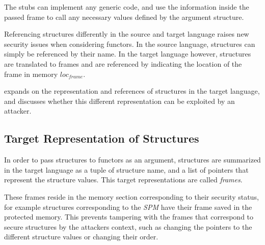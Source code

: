 \documentclass[10pt,a4paper,master=cws, masteroption=ai,english,inputenc=utf8]{kulemt}
\begin{document}
The stubs can implement any generic code, and use the information inside the passed frame to call any necessary values defined by the argument structure.

\smallskip

Referencing structures differently in the source and target language raises new security issues when considering functors.
In the source language, structures can simply be referenced by their name.
In the target language however, structures are translated to frames and are referenced by indicating the location of the frame in memory $loc_{frame}$.


 expands on the representation and references of structures in the target language, and discusses whether this different representation can be exploited by an attacker.

\subsection{Target Representation of Structures\label{sec:LowLevelRepresentation}}
In order to pass structures to functors as an argument, structures are summarized in the target language as a tuple of structure name, and a list of pointers that represent the structure values.
This target representations are called \emph{frames}.

These frames reside in the memory section corresponding to their security status, for example
structures corresponding to the \emph{SPM} have their frame saved in the protected memory.
This prevents tampering with the frames that correspond to secure structures by the attackers context, such as changing the pointers to the different structure values or changing their order.
\end{document}
